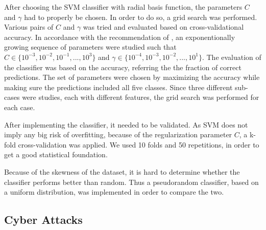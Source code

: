 After choosing the SVM classifier with radial basis function, the parameters $C$ and $\gamma$ had to properly be chosen. In order to do so, a grid search was performed. Various pairs of $C$ and $\gamma$ was tried and evaluated based on cross-validational accuracy. In accordance with the recommendation of \citet{Hsu10apractical}, an exponentionally growing sequence of parameters were studied such that $C\in\{10^{-3},10^{-2},10^{-1},...,10^{3}\}$ and $\gamma\in\{10^{-4},10^{-3},10^{-2},...,10^{1}\}$. The evaluation of the classifier was based on the accuracy, referring the the fraction of correct predictions. The set of parameters were chosen by maximizing the accuracy while making sure the predictions included all five classes.
Since three different sub-cases were studies, each with different features, the grid search was performed for each case. 

After implementing the classifier, it needed to be validated. As SVM does not imply any big risk of overfitting, because of the regularization parameter $C$, a k-fold cross-validation was applied. We used 10 folds and 50 repetitions, in order to get a good statistical foundation.

Because of the skewness of the dataset, it is hard to determine whether the classifier performs better than random. Thus a pseudorandom classifier, based on a uniform distribution, was implemented in order to compare the two. 

\subsection{Cyber Attacks}\label{cybertattacks}



\newpage 
